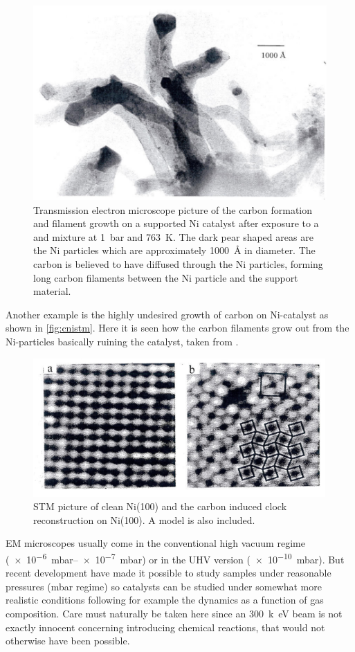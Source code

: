 \begin{figure}[h!]
	\begin{center}
	\includegraphics[scale=4]{figures/10_17.png}
	\caption{Transmission electron microscope picture of the carbon formation and filament growth on a  supported Ni catalyst after exposure to a  and  mixture at \SI{1}{bar} and \SI{763}{K}. The dark pear shaped areas are the Ni particles which are approximately \SI{1000}{\angstrom} in diameter. The carbon is believed to have diffused through the Ni particles, forming long carbon filaments between the Ni particle and the support material.}
	\label{fig:cnisio2tem}
	\end{center}
\end{figure}

Another example is the highly undesired growth of carbon on Ni-catalyst as shown in \autoref{fig:cnistm}. Here it is seen how the carbon filaments grow out from the Ni-particles basically ruining the catalyst, taken from \cite{carbon}.

\begin{figure}[h!]
	\begin{center}
	\includegraphics[scale=4]{figures/10_18.png}
	\caption{STM picture of clean Ni(100) and the carbon induced clock reconstruction on Ni(100). A model is also included.}
	\label{fig:cnistm}
	\end{center}
\end{figure}

EM microscopes usually come in the conventional high vacuum regime (\SIrange{e-6}{e-7}{mbar}) or in the UHV version (\SI{e-10}{mbar}). But  recent development have made it possible to study samples under reasonable pressures (mbar regime) so catalysts can be studied under somewhat more realistic conditions following for example the dynamics as a function of gas composition. Care must naturally be taken here since an \SI{300}{k\electronvolt} beam is not exactly innocent concerning introducing chemical reactions, that would not otherwise have been possible.